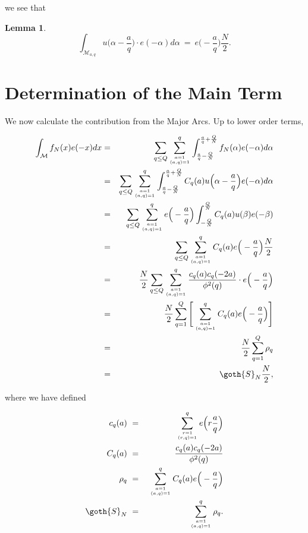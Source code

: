 \documentclass[12pt,letterpaper]{report}
\newcommand\be{\begin{equation}}
\newcommand\ee{\end{equation}}
\newcommand\bea{\begin{eqnarray}}
\newcommand\eea{\end{eqnarray}}
\newtheorem{lem}[thm]{Lemma}
\begin{document}
we see that

\begin{lem}

\be \int_{\mathcal{M}_{a,q}} u\Big( \alpha - \frac{a}{q} \Big)
\cdot e(-\alpha)d\alpha  \ = \ e\Big( -\frac{a}{q} \Big)
\frac{N}{2}. \ee

\end{lem}



\section{Determination of the Main Term}

We now calculate the contribution from the Major Arcs. Up to lower
order terms,

\bea \int_{ \mathcal{M} } f_N(x) e(-x)dx &=& \sum_{q \le Q}
\sum_{a = 1 \atop (a,q)=1}^{q} \int_{ \frac{a}{q} - \frac{Q}{N}
}^{\frac{a}{q} + \frac{Q}{N}} f_N(\alpha) e(-\alpha) d\alpha
\nonumber\\ &=& \sum_{q \le Q} \sum_{a = 1 \atop (a,q)=1}^{q}
\int_{ \frac{a}{q} - \frac{Q}{N} }^{\frac{a}{q} + \frac{Q}{N}}
C_q(a) u\Big( \alpha - \frac{a}{q} \Big) e(-\alpha)d\alpha \nonumber\\
&=& \sum_{q \le Q} \sum_{a = 1 \atop (a,q)=1}^{q} e\Big( -
\frac{a}{q} \Big) \int_{ -
\frac{Q}{N} }^{\frac{Q}{N}} C_q(a) u(\beta) e(-\beta) \nonumber\\
&=& \sum_{q \le Q} \sum_{a = 1 \atop (a,q)=1}^{q} C_q(a) e\Big( -
\frac{a}{q} \Big) \frac{N}{2} \nonumber\\ &=&  \frac{N}{2} \sum_{q
\le Q} \sum_{a = 1 \atop (a,q)=1}^{q}
\frac{c_q(a)c_q(-2a)}{\phi^2(q)} \cdot e\Big( - \frac{a}{q} \Big)
\nonumber\\ &=&  \frac{N}{2} \sum_{q=1}^Q \Bigg[\sum_{a = 1 \atop
(a,q)=1}^q C_q(a) e\Big( - \frac{a}{q} \Big) \Bigg] \nonumber\\
&=& \frac{N}{2} \sum_{q=1}^Q \rho_q \nonumber\\ &=& \goth{S}_N
\frac{N}{2}, \eea

where we have defined

\bea c_q(a) & \ = \ & \sum_{r = 1 \atop (r,q) = 1}^q e\Big( r
\frac{a}{q} \Big)
\nonumber\\ C_q(a) &\ = \ & \frac{c_q(a)c_q(-2a)}{\phi^2(q)} \nonumber\\
\rho_q &\ = \ & \sum_{a = 1 \atop
(a,q)=1}^q C_q(a) e\Big( - \frac{a}{q} \Big) \nonumber\\
\goth{S}_N & \ = \ & \sum_{a = 1 \atop (a,q)=1}^{q} \rho_q. \eea
\end{document}
